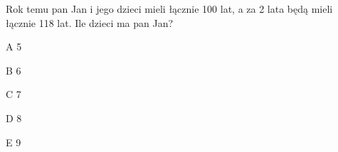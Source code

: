 \begin{tresc}
Rok temu pan Jan i jego dzieci mieli łącznie 100 lat, a za 2 lata będą mieli łącznie 118 lat. Ile dzieci ma pan Jan?
\end{tresc}
\begin{wariant}{A} 5 \end{wariant}
\begin{wariant}{B} 6 \end{wariant}
\begin{wariant}{C} 7 \end{wariant}
\begin{wariant}{D} 8 \end{wariant}
\begin{wariant}{E} 9 \end{wariant}
